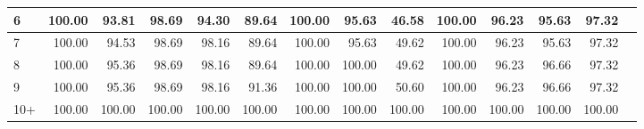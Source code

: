 \begin{tabular}{|l|r|r|r|r|r|r|r|r|r|r|r|r|r|}
6 & 100.00 & 93.81 & 98.69 & 94.30 & 89.64 & 100.00 & 95.63 & 46.58 & 100.00 & 96.23 & 95.63 & 97.32\\\hline
7 & 100.00 & 94.53 & 98.69 & 98.16 & 89.64 & 100.00 & 95.63 & 49.62 & 100.00 & 96.23 & 95.63 & 97.32\\\hline
8 & 100.00 & 95.36 & 98.69 & 98.16 & 89.64 & 100.00 & 100.00 & 49.62 & 100.00 & 96.23 & 96.66 & 97.32\\\hline
9 & 100.00 & 95.36 & 98.69 & 98.16 & 91.36 & 100.00 & 100.00 & 50.60 & 100.00 & 96.23 & 96.66 & 97.32\\\hline
10+ & 100.00 & 100.00 & 100.00 & 100.00 & 100.00 & 100.00 & 100.00 & 100.00 & 100.00 & 100.00 & 100.00 & 100.00\\\hline
\end{tabular}
